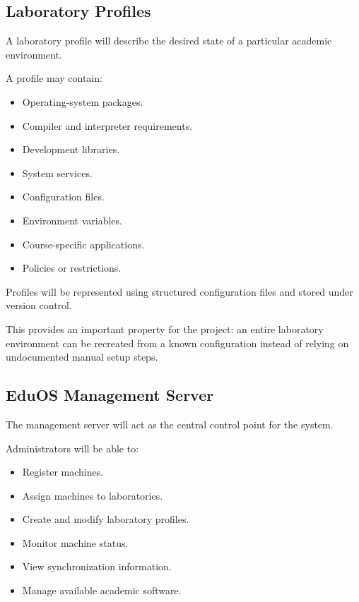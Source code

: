 \documentclass[12pt,a4paper]{article}
\begin{document}
\subsection{Laboratory Profiles}

A laboratory profile will describe the desired state of a particular academic environment.

A profile may contain:

\begin{itemize}
    \item Operating-system packages.
    \item Compiler and interpreter requirements.
    \item Development libraries.
    \item System services.
    \item Configuration files.
    \item Environment variables.
    \item Course-specific applications.
    \item Policies or restrictions.
\end{itemize}

Profiles will be represented using structured configuration files and stored under version control.

This provides an important property for the project: an entire laboratory environment can be recreated from a known configuration instead of relying on undocumented manual setup steps.

\subsection{EduOS Management Server}

The management server will act as the central control point for the system.

Administrators will be able to:

\begin{itemize}
    \item Register machines.
    \item Assign machines to laboratories.
    \item Create and modify laboratory profiles.
    \item Monitor machine status.
    \item View synchronization information.
    \item Manage available academic software.
\end{itemize}
\end{document}
